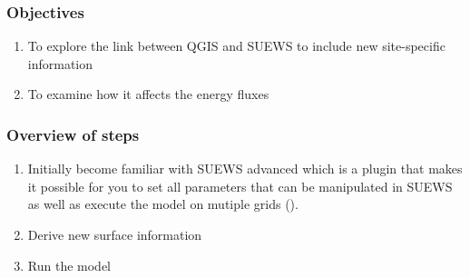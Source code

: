 \documentclass[letterpaper,10pt,english]{sphinxmanual}
\begin{document}
\subsubsection{Objectives}
\label{\detokenize{Tutorials/SuewsAdvanced:objectives}}\begin{enumerate}
\item {} 
To explore the link between QGIS and SUEWS to include new
site-specific information

\item {} 
To examine how it affects the energy fluxes

\end{enumerate}


\subsubsection{Overview of steps}
\label{\detokenize{Tutorials/SuewsAdvanced:overview-of-steps}}\begin{enumerate}
\item {} 
Initially become familiar with SUEWS advanced which is a
plugin that makes it possible for you to set all parameters that can
be manipulated in SUEWS as well as execute the model on mutiple grids ({\hyperref[\detokenize{Tutorials/SuewsSpatial:suewsspatial}]{}}).

\item {} 
Derive new surface information

\item {} 
Run the model

\end{enumerate}
\end{document}
